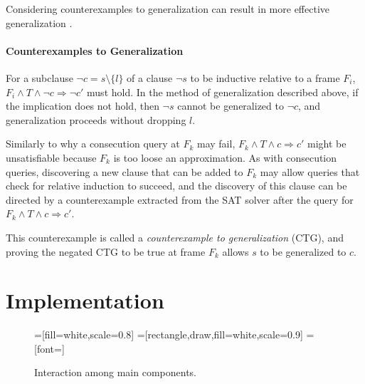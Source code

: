 \documentclass[12pt,a4paper,twoside,openright]{report}
\begin{document}
{{Considering counterexamples to generalization can result in more effective
generalization \cite{hassan13}.

\subsubsection{Counterexamples to Generalization}

For a subclause $\neg c = s \setminus \{l\}$ of a clause $\neg s$ to be
inductive relative to a frame $F_i$,
$F_i \wedge T \wedge \neg c \Rightarrow \neg c'$ must hold.
In the method of generalization described above,
if the implication does not hold, then
$\neg s$ cannot be generalized to $\neg c$, and generalization
proceeds without dropping $l$.

Similarly to why a consecution query at $F_k$ may fail,
$F_k \wedge T \wedge c \Rightarrow c'$ might be unsatisfiable because
$F_k$ is too loose an approximation. As with consecution queries, discovering a
new clause that can be added to $F_k$ may allow queries that
check for relative induction to succeed, and the discovery of this
clause can be directed by a counterexample extracted from the
SAT solver after the query for $F_k \wedge T \wedge c \Rightarrow c'$.

This counterexample is called a \emph{counterexample
to generalization} (CTG), and proving the negated CTG to be true at
frame $F_k$ allows $s$ to be generalized to $c$.


\chapter{Implementation}
\label{impl}

\begin{figure}[t]
=[fill=white,scale=0.8]
=[rectangle,draw,fill=white,scale=0.9]
=[font=\footnotesize]
\caption{Interaction among main components.}
\label{components}
\end{figure}

}}
\end{document}
